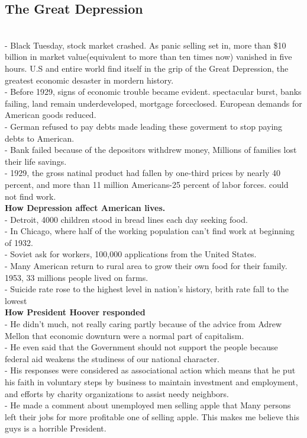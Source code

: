 \documentclass{article}
\begin{document}
\subsection{ The Great Depression}\\
- Black Tuesday, stock market crashed. As panic selling set in, more than \$10 billion in market value(equivalent to more than ten times now) vanished in five hours. U.S and entire world find itself in the grip of the Great Depression, the greatest economic desaster in mordern history.\\
- Before 1929, signs of economic trouble became evident. spectacular burst, banks failing, land remain underdeveloped, mortgage forceclosed. European demands for American goods reduced. \\
- German refused to pay debts made leading these goverment to stop paying debts to American.\\
- Bank failed because of the depositors withdrew money, Millions of families lost their life savings.\\
- 1929, the gross natinal product had fallen by one-third prices by nearly 40 percent, and more than 11 million Americans-25 percent of labor forces. could not find work.\\
\textbf{How Depression affect American lives.}\\
- Detroit, 4000 children stood in bread lines each day seeking food.\\
- In Chicago, where half of the working population can't find work at beginning of 1932.\\
- Soviet ask for workers, 100,000 applications from the United States.\\
- Many American return to rural area to grow their own food for their family. 1953, 33 millions people lived on farms.\\
- Suicide rate rose to the highest level in nation's history, brith rate fall to the lowest\\
\textbf{ How President Hoover responded}\\
- He didn't much, not really caring partly because of the advice from Adrew Mellon that economic downturn were a normal part of capitalism.\\
- He even said that the Government should not support the people because federal aid weakens the studiness of our national character.\\
- His responses were considered as associational action which means that he put his faith in voluntary steps by business to maintain investment and employment, and efforts by charity organizations to assist needy neighbors.\\
- He made a comment about unemployed men selling apple that Many persons left their jobs for more profitable one of selling apple. This makes me believe this guys is a horrible President.\\
\end{document}

